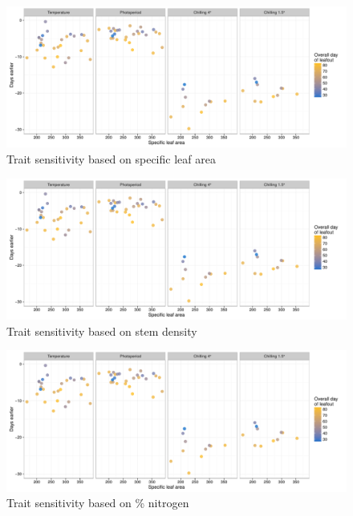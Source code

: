 \documentclass{article}
\begin{document}
\clearpage

\begin{figure}
\caption{Trait sensitivity based on specific leaf area}
\label{figS5}
\includegraphics[scale=0.95, page=1]{Traits_vs_sensitivity}
\end{figure}

\begin{figure}
\caption{Trait sensitivity based on stem density}
\label{figS6}
\includegraphics[scale=0.95, page=2]{Traits_vs_sensitivity}
\end{figure}

\begin{figure}
\caption{Trait sensitivity based on \% nitrogen}
\label{figS7}
\includegraphics[scale=0.95, page=3]{Traits_vs_sensitivity}
\end{figure}
\end{document}
